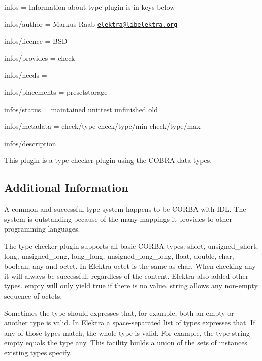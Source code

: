 
\begin{DoxyItemize}
\item infos = Information about type plugin is in keys below
\item infos/author = Markus Raab \href{mailto:elektra@libelektra.org}{\tt elektra@libelektra.\+org}
\item infos/licence = B\+S\+D
\item infos/provides = check
\item infos/needs =
\item infos/placements = presetstorage
\item infos/status = maintained unittest unfinished old
\item infos/metadata = check/type check/type/min check/type/max
\item infos/description =
\end{DoxyItemize}

This plugin is a type checker plugin using the {\ttfamily C\+O\+B\+R\+A} data types.

\subsection*{Additional Information}

A common and successful type system happens to be C\+O\+R\+B\+A with I\+D\+L. The system is outstanding because of the many mappings it provides to other programming languages.

The type checker plugin supports all basic C\+O\+R\+B\+A types\+: {\ttfamily short}, {\ttfamily unsigned\+\_\+short}, {\ttfamily long}, {\ttfamily unsigned\+\_\+long}, {\ttfamily long\+\_\+long}, {\ttfamily unsigned\+\_\+long\+\_\+long}, {\ttfamily float}, {\ttfamily double}, {\ttfamily char}, {\ttfamily boolean}, {\ttfamily any} and {\ttfamily octet}. In Elektra {\ttfamily octet} is the same as {\ttfamily char}. When checking any it will always be successful, regardless of the content. Elektra also added other types. {\ttfamily empty} will only yield true if there is no value. {\ttfamily string} allows any non-\/empty sequence of octets.

Sometimes the type should expresses that, for example, both an empty or another type is valid. In Elektra a space-\/separated list of types expresses that. If any of those types match, the whole type is valid. For example, the type {\ttfamily string empty} equals the type {\ttfamily any}. This facility builds a union of the sets of instances existing types specify.


